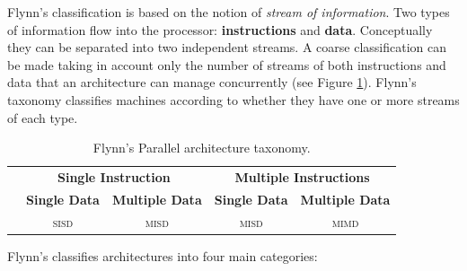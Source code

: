 Flynn's classification is based on the notion of  \textit{stream of information}.
Two types of information flow into the processor: \textbf{instructions} and \textbf{data}.
Conceptually they can be separated into two independent streams.
A coarse classification can be made taking in account only the number of streams of both instructions and
data that an architecture can manage concurrently (see Figure \ref{fig:parallelClassification1}).
Flynn's taxonomy classifies machines according to whether they have one or more streams of each type.
\begin{table}
		\caption[Flynn's Parallel architecture taxonomy]{Flynn's Parallel architecture taxonomy.}
	\label{fig:parallelClassification1}
	\begin{tabular}{lcccc}\toprule
		&\multicolumn{2}{c}{\textbf{\textsf{Single Instruction}}}&\multicolumn{2}{c}{\textbf{\textsf{Multiple Instructions}}}
		\\\cmidrule(r){2-3}\cmidrule(r){4-5}   
		&\textbf{\textsf{Single Data}}&\textbf{\textsf{Multiple Data}}&\textbf{\textsf{Single Data}}&\textbf{\textsf{Multiple Data}}\\\midrule
		& \textsc{sisd} & \textsc{misd}
		& \textsc{misd} & \textsc{mimd}
		\\\bottomrule
	\end{tabular}

\end{table}
Flynn's classifies architectures into four main categories:
